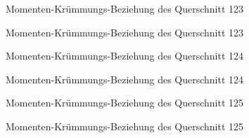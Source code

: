\documentclass[
  11pt,
  letterpaper,
]{scrreprt}
\begin{document}
\begin{figure}[H]


\caption{\label{fig-qs_123}Momenten-Krümmungs-Beziehung des Querschnitt
123}

\end{figure}%

\begin{figure}[H]


\caption{\label{fig-m_chi_123}Momenten-Krümmungs-Beziehung des
Querschnitt 123}

\end{figure}%

\begin{figure}[H]


\caption{\label{fig-qs_124}Momenten-Krümmungs-Beziehung des Querschnitt
124}

\end{figure}%

\begin{figure}[H]


\caption{\label{fig-m_chi_124}Momenten-Krümmungs-Beziehung des
Querschnitt 124}

\end{figure}%

\begin{figure}[H]


\caption{\label{fig-qs_125}Momenten-Krümmungs-Beziehung des Querschnitt
125}

\end{figure}%

\begin{figure}[H]


\caption{\label{fig-m_chi_125}Momenten-Krümmungs-Beziehung des
Querschnitt 125}

\end{figure}%
\end{document}
